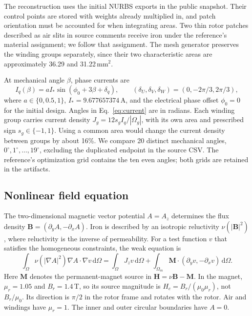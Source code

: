 \documentclass{anvil-paper}
\newcommand{\dd}{\,\mathrm{d}}
\begin{document}
The reconstruction uses the initial NURBS exports in the public snapshot.
Their control points are stored with weights already multiplied in, and
patch orientation must be accounted for when integrating areas. Two thin
rotor patches described as air slits in source comments receive iron under
the reference's material assignment; we follow that assignment. The
mesh generator preserves the winding groups separately, since their two
characteristic areas are approximately 36.29 and 31.22\,mm$^2$.

At mechanical angle $\beta$, phase currents are
\begin{equation}
 I_q(\beta)=a I_*\sin(\phi_0+3\beta+\delta_q),\qquad
 (\delta_U,\delta_V,\delta_W)=(0,-2\pi/3,2\pi/3),
 \label{eq:current}
\end{equation}
where $a\in\{0,0.5,1\}$, $I_*=9.677657374$\,A, and the electrical phase
offset $\phi_0=0$ for the initial design. Angles in
Eq.~\eqref{eq:current} are in radians. Each winding group carries current
density $J_g=12s_g I_q/|\Omega_g|$, with its own area and prescribed sign
$s_g\in\{-1,1\}$. Using a common area would change the current density
between groups by about 16\%. We compare 20 distinct mechanical angles,
$0^\circ,1^\circ,\ldots,19^\circ$, excluding the duplicated endpoint in
the source CSV. The reference's optimization grid contains the ten even
angles; both grids are retained in the artifacts.

\subsection{Nonlinear field equation}
The two-dimensional magnetic vector potential $A=A_z$ determines the
flux density $\mathbf B=(\partial_y A,-\partial_x A)$. Iron is described
by an isotropic reluctivity $\nu(|\mathbf B|^2)$, where reluctivity is
the inverse of permeability. For a test function $v$ that satisfies the
homogeneous constraints, the weak equation is
\begin{equation}
 \int_\Omega \nu(|\nabla A|^2)\nabla A\cdot\nabla v\dd\Omega
 =\int_\Omega J_z v\dd\Omega
  +\int_{\Omega_m}\mathbf M\cdot(\partial_y v,-\partial_x v)\dd\Omega.
 \label{eq:weak}
\end{equation}
Here $\mathbf M$ denotes the permanent-magnet source in
$\mathbf H=\nu\mathbf B-\mathbf M$. In the magnet,
$\mu_r=1.05$ and $B_r=1.4$\,T, so its source magnitude is
$H_c=B_r/(\mu_0\mu_r)$, not $B_r/\mu_0$. Its direction is $\pi/2$
in the rotor frame and rotates with the rotor. Air and windings have
$\mu_r=1$. The inner and outer circular boundaries have $A=0$.
\end{document}
